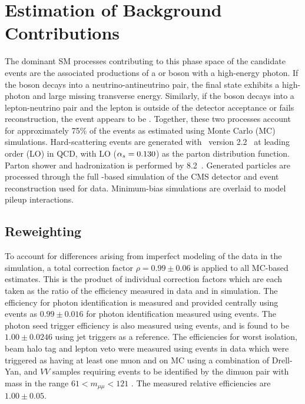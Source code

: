\section{Estimation of Background Contributions}

The dominant SM processes contributing to this 
 phase space of the candidate events 
 are the associated productions of a \z
 or \w boson with a high-energy photon. 
If the \z boson decays into a  neutrino-antineutrino pair, 
 the final state exhibits a high-\et photon and large
 missing transverse energy. 
Similarly, if the \w boson decays into a lepton-neutrino
 pair and  the lepton is outside of the detector acceptance
 or fails reconstruction, the event appears to be \gmet.
 Together, these two processes account for approximately
  75\% of the events as
 estimated using Monte Carlo (MC) simulations. 
Hard-scattering events are generated with \MGfiveAMC\
  version 2.2~\cite{Alwall:2014hca} at leading order (LO) in QCD,
 with  \NNPDFthree LO ($\alpha_s = 0.130$) as the parton distribution function.
Parton shower and hadronization is performed by \PYTHIA{}8.2~\cite{Sjostrand:2014zea}.
Generated particles are processed through the full \GEANT-based simulation of the CMS 
 detector \cite{GEANT, GEANTdev} and event reconstruction used for data. 
Minimum-bias simulations are overlaid to model pileup interactions.

 \subsection{Reweighting}\label{subsubsec:lg_reweighting}
To account for differences arising from imperfect modeling of the data in
 the simulation, a total correction factor $\rho = 0.99 \pm 0.06$ is applied to all 
 MC-based  estimates. 
This is the product of individual correction factors which 
 are each taken as the
 ratio of the efficiency measured in data and in simulation.
The efficiency for photon identification is measured
 and provided centrally using \zee events as 
 $0.99\pm0.016$ for photon identification measured using \zee events.
The photon seed trigger efficiency is also measured using \zee events,
 and is found to be $1.00\pm0.0246$ using jet triggers as a reference.
The efficiencies for 
 worst isolation, beam halo tag and lepton veto 
 were measured using events in data which were triggered as having at least
 one muon and on MC using a combination of Drell-Yan, \ttbar and $VV$ 
 samples requiring \zgmmg events to be identified by
 the dimuon pair with mass in the range $61<m_{\mu\mu}<121$ \GeV.
The measured relative efficiencies are $1.00\pm0.05$.

